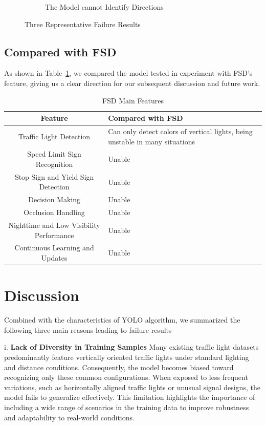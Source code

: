 \documentclass[journal,transmag]{IEEEtran}
\begin{document}
\begin{figure}[h]
\begin{subfigure}[b]{0.3\textwidth}
        \caption{The Model cannot Identify Directions
}
        \label{fig:sub3}
    \end{subfigure}
    \caption{Three Representative Failure Results}
    \label{fig:combined}
\end{figure}

\subsection{Compared with FSD}
As shown in Table~\ref{tab:FSD_Feature_Compare}, we compared the model tested in experiment with FSD's feature, giving us a clear direction for our subsequent discussion and future work.

\begin{table}[t]
\centering
\caption{FSD Main Features}
\label{tab:FSD_Feature_Compare}
\begin{tabular}{|c|>{\centering\arraybackslash}p{9cm}|}  
\hline
\textbf{Feature} & \textbf{Compared with FSD} \\
\hline
Traffic Light Detection & Can only detect colors of vertical lights, being unstable in many situations \\
\hline
Speed Limit Sign Recognition & Unable \\
\hline
Stop Sign and Yield Sign Detection & Unable \\
\hline
Decision Making & Unable \\
\hline
Occlusion Handling & Unable \\
\hline
Nighttime and Low Visibility Performance & Unable \\
\hline
Continuous Learning and Updates & Unable \\
\hline
\end{tabular}
\end{table}



\section{Discussion}
Combined with the characteristics of YOLO algorithm, we summarized the following three main reasons leading to failure results

i. \textbf{Lack of Diversity in Training Samples} Many existing traffic light datasets predominantly feature vertically oriented traffic lights under standard lighting and distance conditions. Consequently, the model becomes biased toward recognizing only these common configurations. When exposed to less frequent variations, such as horizontally aligned traffic lights or unusual signal designs, the model fails to generalize effectively. This limitation highlights the importance of including a wide range of scenarios in the training data to improve robustness and adaptability to real-world conditions.
\end{document}
